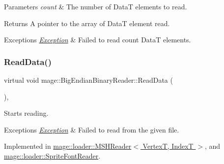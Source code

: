 \begin{DoxyParams}{Parameters}
{\em count} & The number of {\ttfamily DataT} elements to read. \\
\hline
\end{DoxyParams}
\begin{DoxyReturn}{Returns}
A pointer to the array of {\ttfamily DataT} element read. 
\end{DoxyReturn}

\begin{DoxyExceptions}{Exceptions}
{\em \hyperlink{classmage_1_1_exception}{Exception}} & Failed to read {\ttfamily count} {\ttfamily DataT} elements. \\
\hline
\end{DoxyExceptions}
\hypertarget{classmage_1_1_big_endian_binary_reader_a7dc0689d598fa91308597b129516a11d}{}\label{classmage_1_1_big_endian_binary_reader_a7dc0689d598fa91308597b129516a11d} 
\subsubsection{\texorpdfstring{Read\+Data()}{ReadData()}}
{\footnotesize\ttfamily virtual void mage\+::\+Big\+Endian\+Binary\+Reader\+::\+Read\+Data (\begin{DoxyParamCaption}{ }\end{DoxyParamCaption})\hspace{0.3cm}{\ttfamily [private]}, {}}

Starts reading.


\begin{DoxyExceptions}{Exceptions}
{\em \hyperlink{classmage_1_1_exception}{Exception}} & Failed to read from the given file. \\
\hline
\end{DoxyExceptions}


Implemented in \hyperlink{classmage_1_1loader_1_1_m_s_h_reader_aac059b991d1151473af2422be688552e}{mage\+::loader\+::\+M\+S\+H\+Reader$<$ Vertex\+T, Index\+T $>$}, and \hyperlink{classmage_1_1loader_1_1_sprite_font_reader_a9726c5e3ee8692a2e2f4a2c9b4b7adba}{mage\+::loader\+::\+Sprite\+Font\+Reader}.

\hypertarget{classmage_1_1_big_endian_binary_reader_a68db676feaa42c1c3a9bf16d0680b04f}{}\label{classmage_1_1_big_endian_binary_reader_a68db676feaa42c1c3a9bf16d0680b04f} 
